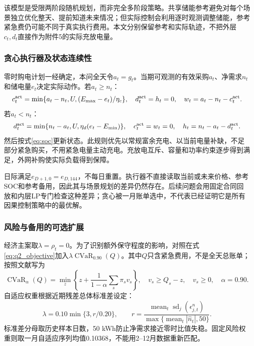 该模型是受限两阶段随机规划，而非完全多阶段策略。共享储能参考避免对每个场景独立优化整天、提前知道未来情况；但实际控制会利用逐时观测调整储能，参考紧急费仍可能不同于真实执行费用。本文分别保留参考和实际轨迹，不把外层$c_t,d_t$直接作为附件5的实际充放电量。

\subsubsection{贪心执行器及状态连续性}

零时购电计划一经确定，本问全天令$a_t=g_t$。当期可观测的有效采购$a_t$、净需求$n_t$和储电量$e_t$决定实际动作。若$a_t\ge n_t$：
\begin{equation}
 c_t^{\rm act}=\min\{a_t-n_t,U,(E_{\max}-e_t)/\eta_c\},\quad
 d_t^{\rm act}=h_t=0,\quad w_t=a_t-n_t-c_t^{\rm act}.
 \label{eq:execute_charge}
\end{equation}
若$a_t<n_t$：
\begin{equation}
 d_t^{\rm act}=\min\{n_t-a_t,U,\eta_d(e_t-E_{\min})\},\quad
 c_t^{\rm act}=w_t=0,\quad h_t=n_t-a_t-d_t^{\rm act}.
 \label{eq:execute_discharge}
\end{equation}
然后按式\eqref{eq:soc}更新状态。此规则优先以常规富余充电、以当前电量补缺，不足部分紧急购买，不用紧急电量主动充电。充放电互斥、容量和功率约束逐步得到满足，外网补购使实际负载得到保障。

日际满足$e_{D+1,0}=e_{D,144}$，不每日重置。执行器不直接读取当前或未来价格、参考SOC和参考备用，因此其与场景规划的差异仍然存在。后续问题会用固定合同回放和内层LP专门检查这种差异；贪心被一月账单选中，不代表已经证明它是所有因果控制策略中的最优解。

\subsubsection{风险与备用的可选扩展}

经济主案取$\lambda=\rho_t=0$。为了识别额外保守程度的影响，对照在式\eqref{eq:q2_objective}加入$\lambda\operatorname{CVaR}_{0.90}(Q)$。其中$Q$只含紧急费用，不是全天总账单；按照文献\cite{rockafellar2000}写为
\begin{equation}
 \operatorname{CVaR}_{\alpha}(Q)=
 \min_z\left\{z+\frac{1}{1-\alpha}\sum_s\pi_sv_s\right\},\quad
 v_s\ge Q_s-z,\quad v_s\ge0,\quad\alpha=0.90.
 \label{eq:cvar}
\end{equation}
自适应权重根据近期残差总体标准差设定：
\begin{equation}
 \lambda=0.10\min\{3,r/0.20\},\qquad
 r=\frac{\operatorname{mean}_t\operatorname{sd}_j(\epsilon^n_{j,t})}
 {\max\{\operatorname{mean}_t|\widehat n_t|,50\}}.
 \label{eq:risk_weight}
\end{equation}
标准差分母取历史样本日数，50 kWh防止净需求接近零时比值失稳。固定风险权重则取一月自适应序列均值0.10368，不能用2--12月数据重新匹配。

